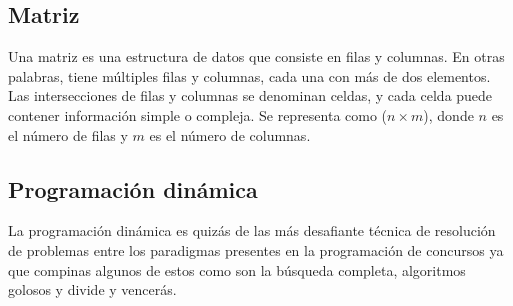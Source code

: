\subsection{Matriz}
Una matriz es una estructura de datos que consiste en filas y columnas. En otras palabras,
tiene múltiples filas y columnas, cada una con más de dos elementos. Las intersecciones de filas
y columnas se denominan celdas, y cada celda puede contener información simple o compleja. Se
representa como ($n \times m$), donde $n$ es el número de filas y $m$ es el número de columnas.


\subsection{Programación dinámica}
La programación dinámica es quizás de las más desafiante técnica de resolución de problemas entre los paradigmas presentes en la programación de
concursos ya que compinas algunos de estos como son la búsqueda completa, algoritmos golosos
y divide y vencerás.